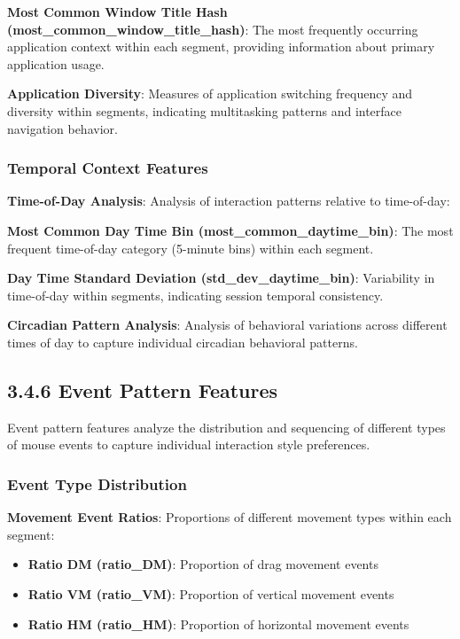 \documentclass[
  12pt,
  a4paper,
]{report}
\providecommand{\tightlist}{%
  \setlength{\itemsep}{0pt}\setlength{\parskip}{0pt}}
\begin{document}
\textbf{Most Common Window Title Hash
(most\_common\_window\_title\_hash)}: The most frequently occurring
application context within each segment, providing information about
primary application usage.

\textbf{Application Diversity}: Measures of application switching
frequency and diversity within segments, indicating multitasking
patterns and interface navigation behavior.

\subsubsection{Temporal Context
Features}\label{temporal-context-features}

\textbf{Time-of-Day Analysis}: Analysis of interaction patterns relative
to time-of-day:

\textbf{Most Common Day Time Bin (most\_common\_daytime\_bin)}: The most
frequent time-of-day category (5-minute bins) within each segment.

\textbf{Day Time Standard Deviation (std\_dev\_daytime\_bin)}:
Variability in time-of-day within segments, indicating session temporal
consistency.

\textbf{Circadian Pattern Analysis}: Analysis of behavioral variations
across different times of day to capture individual circadian behavioral
patterns.

\subsection{3.4.6 Event Pattern Features}\label{event-pattern-features}

Event pattern features analyze the distribution and sequencing of
different types of mouse events to capture individual interaction style
preferences.

\subsubsection{Event Type Distribution}\label{event-type-distribution}

\textbf{Movement Event Ratios}: Proportions of different movement types
within each segment:

\begin{itemize}
\tightlist
\item
  \textbf{Ratio DM (ratio\_DM)}: Proportion of drag movement events
\item
  \textbf{Ratio VM (ratio\_VM)}: Proportion of vertical movement events
\item
  \textbf{Ratio HM (ratio\_HM)}: Proportion of horizontal movement
  events
\end{itemize}
\end{document}
